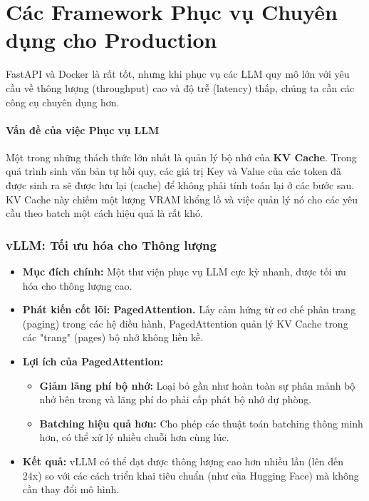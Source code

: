 
\section{Các Framework Phục vụ Chuyên dụng cho Production}
\label{sec:specialized_serving_frameworks}
FastAPI và Docker là rất tốt, nhưng khi phục vụ các LLM quy mô lớn với yêu cầu về thông lượng (throughput) cao và độ trễ (latency) thấp, chúng ta cần các công cụ chuyên dụng hơn.

\paragraph{Vấn đề của việc Phục vụ LLM}
Một trong những thách thức lớn nhất là quản lý bộ nhớ của \textbf{KV Cache}. Trong quá trình sinh văn bản tự hồi quy, các giá trị Key và Value của các token đã được sinh ra sẽ được lưu lại (cache) để không phải tính toán lại ở các bước sau. KV Cache này chiếm một lượng VRAM khổng lồ và việc quản lý nó cho các yêu cầu theo batch một cách hiệu quả là rất khó.

\subsubsection{vLLM: Tối ưu hóa cho Thông lượng}
\begin{itemize}
    \item \textbf{Mục đích chính:} Một thư viện phục vụ LLM cực kỳ nhanh, được tối ưu hóa cho thông lượng cao.
    \item \textbf{Phát kiến cốt lõi: PagedAttention.} Lấy cảm hứng từ cơ chế phân trang (paging) trong các hệ điều hành, PagedAttention quản lý KV Cache trong các "trang" (pages) bộ nhớ không liền kề.
    \item \textbf{Lợi ích của PagedAttention:}
        \begin{itemize}
            \item \textbf{Giảm lãng phí bộ nhớ:} Loại bỏ gần như hoàn toàn sự phân mảnh bộ nhớ bên trong và lãng phí do phải cấp phát bộ nhớ dự phòng.
            \item \textbf{Batching hiệu quả hơn:} Cho phép các thuật toán batching thông minh hơn, có thể xử lý nhiều chuỗi hơn cùng lúc.
        \end{itemize}
    \item \textbf{Kết quả:} vLLM có thể đạt được thông lượng cao hơn nhiều lần (lên đến 24x) so với các cách triển khai tiêu chuẩn (như của Hugging Face) mà không cần thay đổi mô hình.
\end{itemize}

